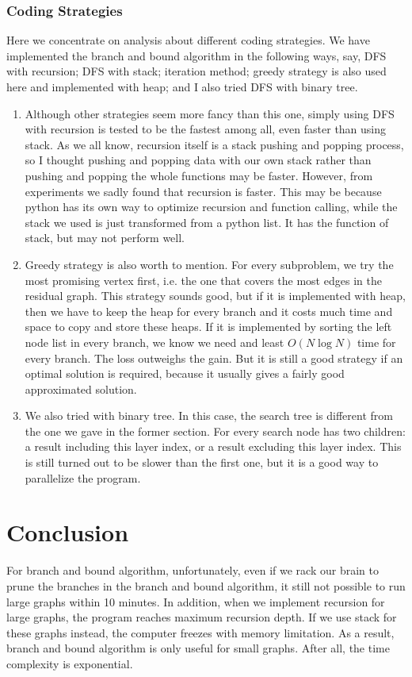 \subsubsection{Coding Strategies}
Here we concentrate on analysis about different coding strategies. We have implemented the branch and bound algorithm in the following ways, say, DFS with recursion; DFS with stack; iteration method; greedy strategy is also used here and implemented with heap; and I also tried DFS with binary tree.
\begin{enumerate}
\item Although other strategies seem more fancy than this one, simply using DFS with recursion is tested to be the fastest among all, even faster than using stack. As we all know, recursion itself is a stack pushing and popping process, so I thought pushing and popping data with our own stack rather than pushing and popping the whole functions may be faster. However, from experiments we sadly found that recursion is faster. This may be because python has its own way to optimize recursion and function calling, while the stack we used is just transformed from a python list. It has the function of stack, but may not perform well.
\item Greedy strategy is also worth to mention. For every subproblem, we try the most promising vertex first, i.e. the one that covers the most edges in the residual graph. This strategy sounds good, but if it is implemented with heap, then we have to keep the heap for every branch and it costs much time and space to copy and store these heaps. If it is implemented by sorting the left node list in every branch, we know we need and least $O\left( N\log N \right)$ time for every branch. The loss outweighs the gain. But it is still a good strategy if an optimal solution is required, because it usually gives a fairly good approximated solution.
\item We also tried with binary tree. In this case, the search tree is different from the one we gave in the former section. For every search node has two children: a result including this layer index, or a result excluding this layer index. This is still turned out to be slower than the first one, but it is a good way to parallelize the program.
\end{enumerate}

\section{Conclusion}
For branch and bound algorithm, unfortunately, even if we rack our brain to prune the branches in the branch and bound algorithm, it still not possible to run large graphs within 10 minutes. In addition, when we implement recursion for large graphs, the program reaches maximum recursion depth. If we use stack for these graphs instead, the computer freezes with memory limitation. As a result, branch and bound algorithm is only useful for small graphs. After all, the time complexity is exponential.

\nocite{*}


